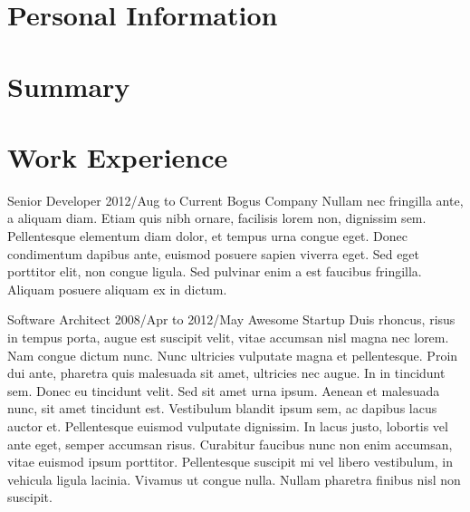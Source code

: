 \documentclass{leancv}
\begin{document}
\begin{leancv}


\section{Personal Information}



\section{Summary}


\section{Work Experience}

\jobentry
	{Senior Developer}
	{2012/Aug to Current}
	{Bogus Company}
	{Nullam nec fringilla ante, a aliquam diam. Etiam quis nibh ornare, facilisis lorem non, dignissim sem. Pellentesque elementum diam dolor, et tempus urna congue eget. Donec condimentum dapibus ante, euismod posuere sapien viverra eget. Sed eget porttitor elit, non congue ligula. Sed pulvinar enim a est faucibus fringilla. Aliquam posuere aliquam ex in dictum.}

\jobentry
	{Software Architect}
	{2008/Apr to 2012/May}
	{Awesome Startup}
	{Duis rhoncus, risus in tempus porta, augue est suscipit velit, vitae accumsan nisl magna nec lorem. Nam congue dictum nunc. Nunc ultricies vulputate magna et pellentesque. Proin dui ante, pharetra quis malesuada sit amet, ultricies nec augue. In in tincidunt sem. Donec eu tincidunt velit. Sed sit amet urna ipsum. Aenean et malesuada nunc, sit amet tincidunt est. Vestibulum blandit ipsum sem, ac dapibus lacus auctor et. Pellentesque euismod vulputate dignissim. In lacus justo, lobortis vel ante eget, semper accumsan risus. Curabitur faucibus nunc non enim accumsan, vitae euismod ipsum porttitor. Pellentesque suscipit mi vel libero vestibulum, in vehicula ligula lacinia. Vivamus ut congue nulla. Nullam pharetra finibus nisl non suscipit.}



\end{leancv}
\end{document}
